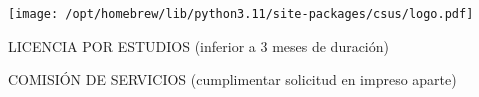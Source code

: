 \documentclass[a4paper,10pt]{article}
\begin{document}
\begin{minipage}{0.3\textwidth}
\texttt{[image:  /opt/homebrew/lib/python3.11/site-packages/csus/logo.pdf]}
\end{minipage}
\begin{minipage}{0.7\textwidth}

\vspace{20mm}

{\LARGE \Square} \large LICENCIA POR ESTUDIOS
\normalsize (inferior a 3 meses de duración)

\vspace{5mm}

{\LARGE \XBox} \large COMISIÓN DE SERVICIOS
\normalsize (cumplimentar
solicitud en impreso aparte)
\end{minipage}

\vspace{-2mm}
\end{document}

